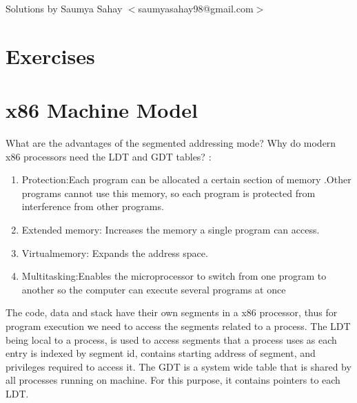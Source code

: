 \vskip 1cm
\begin{flushright}
Solutions by Saumya Sahay $<$saumyasahay98@gmail.com$>$
\end{flushright}
\section*{Exercises}
\vskip 1cm
\setcounter{Exercise}{0}
\setcounter{Answer}{0}

\section*{x86 Machine Model}


\begin{ExerciseList}

\Exercise
What are the advantages of the segmented addressing mode? Why do modern x86 processors
need the LDT and GDT tables?
 \Answer  :
\begin{enumerate}
\item Protection:Each program can be allocated a certain section of memory .Other programs cannot use this memory, so each program is protected from interference from other programs.
\item Extended memory: Increases the memory a single program can access.
\item Virtualmemory: Expands the address space.
\item Multitasking:Enables the microprocessor to switch from one program to another so the computer can execute several programs at once
\end{enumerate}

The code, data and stack have their own segments in a x86 processor, thus for program execution we need to access the segments related to a process.
The LDT being local to a process, is used to access segments that a process uses as each entry is indexed by segment id, contains starting address of segment, and privileges required to access it.
The GDT  is  a system wide table that is shared by all processes running on machine. For this purpose, it contains pointers to each LDT.\\


\end{ExerciseList}
